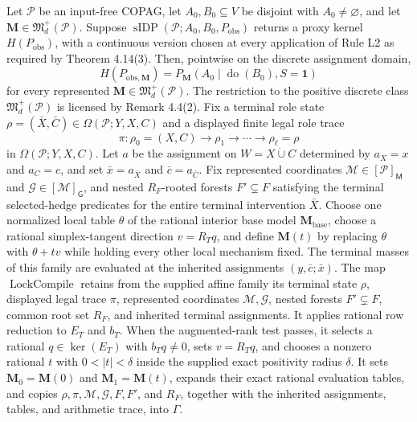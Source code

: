 Let \(\mathcal P\) be an input-free COPAG, let \(A_0,B_0\subseteq V\) be disjoint with \(A_0\neq\varnothing\), and let \(\mathbf M\in\mathfrak M_d^+(\mathcal P)\). Suppose \(\operatorname{sIDP}(\mathcal P;A_0,B_0,P_{\mathrm{obs}})\) returns a proxy kernel \(H(P_{\mathrm{obs}})\), with a continuous version chosen at every application of Rule L2 as required by Theorem 4.14(3). Then, pointwise on the discrete assignment domain,
\[
 H(P_{\mathrm{obs},\mathbf M})
 =P_{\mathbf M}(A_0\mid\operatorname{do}(B_0),S=\mathbf 1)
\]
for every represented \(\mathbf M\in\mathfrak M_d^+(\mathcal P)\). The restriction to the positive discrete class \(\mathfrak M_d^+(\mathcal P)\) is licensed by Remark 4.4(2).
Fix a terminal role state \(\rho=(\bar X,\bar C)\in\Omega(\mathcal P;Y,X,C)\) and a displayed finite legal role trace
\[
 \pi:\rho_0=(X,C)\longrightarrow\rho_1\longrightarrow\cdots\longrightarrow\rho_\ell=\rho
\]
in \(\Omega(\mathcal P;Y,X,C)\). Let \(a\) be the assignment on \(W=X\mathbin{\dot\cup}C\) determined by \(a_X=x\) and \(a_C=c\), and set \(\bar x=a_{\bar X}\) and \(\bar c=a_{\bar C}\). Fix represented coordinates \(\mathcal M\in[\mathcal P]_{\mathsf M}\) and \(\mathcal G\in[\mathcal M]_{\mathsf G}\), and nested \(R_F\)-rooted forests \(F'\subsetneq F\) satisfying the terminal selected-hedge predicates for the entire terminal intervention \(\bar X\). Choose one normalized local table \(\theta\) of the rational interior base model \(\mathbf M_{\mathrm{base}}\), choose a rational simplex-tangent direction \(v=R_Tq\), and define \(\mathbf M(t)\) by replacing \(\theta\) with \(\theta+t v\) while holding every other local mechanism fixed. The terminal masses of this family are evaluated at the inherited assignments \((y,\bar c;\bar x)\).
The map \(\operatorname{LockCompile}\) retains from the supplied affine family its terminal state \(\rho\), displayed legal trace \(\pi\), represented coordinates \(\mathcal M,\mathcal G\), nested forests \(F'\subsetneq F\), common root set \(R_F\), and inherited terminal assignments. It applies rational row reduction to \(E_T\) and \(b_T\). When the augmented-rank test passes, it selects a rational \(q\in\ker(E_T)\) with \(b_Tq\neq0\), sets \(v=R_Tq\), and chooses a nonzero rational \(t\) with \(0<|t|<\delta\) inside the supplied exact positivity radius \(\delta\). It sets \(\mathbf M_0=\mathbf M(0)\) and \(\mathbf M_1=\mathbf M(t)\), expands their exact rational evaluation tables, and copies \(\rho,\pi,\mathcal M,\mathcal G,F,F'\), and \(R_F\), together with the inherited assignments, tables, and arithmetic trace, into \(\Gamma\).

